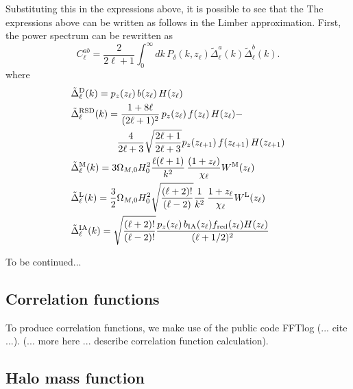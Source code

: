 \documentclass[\docopts]{\docclass}
\begin{document}
Substituting this in the expressions above, it is possible to see that the The expressions above can be written as follows in the Limber approximation. First, the power spectrum
can be rewritten as
\begin{equation}
 C^{ab}_\ell=\frac{2}{2\ell+1}\int_0^\infty dk\,P_\delta\left(k,z_\ell\right)
 \tilde{\Delta}^a_\ell(k)\tilde{\Delta}^b_\ell(k).
\end{equation}
where
\begin{align}
 &\tilde{\Delta}_\ell^{\rm D}(k)=p_z(z_\ell)\,b(z_\ell)\,H(z_\ell)\\
 &\tilde{\Delta}_\ell^{\rm RSD}(k)=
 \frac{1+8\ell}{(2\ell+1)^2}\,p_z(z_\ell)\,f(z_\ell)\,H(z_\ell)-\\
 &\hspace{48pt}\frac{4}{2\ell+3}\sqrt{\frac{2\ell+1}{2\ell+3}}p_z(z_{\ell+1})\,f(z_{\ell+1})\,H(z_{\ell+1})\\
 &\tilde{\Delta}_\ell^{\rm M}(k)=3\Omega_{M,0}H_0^2\frac{\ell(\ell+1)}{k^2}\,
 \frac{(1+z_\ell)}{\chi_\ell}W^{\rm M}(z_\ell)\\
 &\tilde{\Delta}_\ell^{\rm L}(k)=\frac{3}{2}\Omega_{M,0}H_0^2\sqrt{\frac{(\ell+2)!}{(\ell-2)}}\frac{1}{k^2}\,
 \frac{1+z_\ell}{\chi_\ell}W^{\rm L}(z_\ell)\\
 &\tilde{\Delta}_\ell^{\rm IA}(k)=\sqrt{\frac{(\ell+2)!}{(\ell-2)!}}\frac{p_z(z_\ell)\,b_{\rm IA}(z_\ell)f_{\rm red}(z_\ell)H(z_\ell)}{(\ell+1/2)^2}
\end{align}

To be continued...


\subsection{Correlation functions}
\label{sec:corr}

To produce correlation functions, we make use of the public code FFTlog (... cite ...). (... more here ... describe correlation function calculation).



\subsection{Halo mass function}
\label{sec:hmf}
\end{document}
